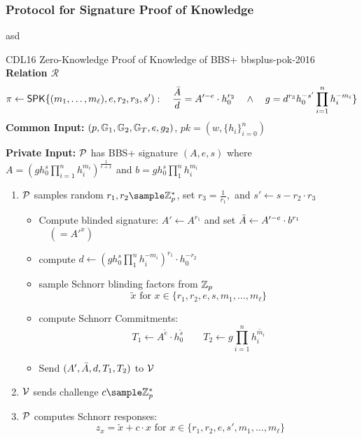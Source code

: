{\subsubsection{Protocol for Signature Proof of Knowledge}
asd
\begin{protocol}{CDL16 Zero-Knowledge Proof of Knowledge of BBS+  \cite{camenisch_anonymous_2016}}{bbsplus-pok-2016}
    \textbf{Relation $\mathcal{R}$}
        \[
        \pi \gets \mathsf{SPK}\{(m_1,\ldots,m_{\ell}), e, r_2, r_3, s'): \quad \frac{\Bar{A}}{d} = A'^{-e} \cdot h_0^{r_2} \quad \wedge \quad g = d^{r_3}h_0^{-s'}\prod_{i=1}^n h_i^{-m_i}\}
        \]
    \textbf{Common Input:} $(p, \mathbb{G}_1, \mathbb{G}_2, \mathbb{G}_T, e, g_2)$, $pk = (\hat{w}, \{h_i\}_{i=0}^n)$

    \textbf{Private Input:} $\mathcal{P}$ has BBS+ signature $(A,e,s)$ where $A = (gh_0^s\prod_{i=1}^n h_i^{m_i})^{\frac{1}{e+x}}$ and $b = gh_0^s \prod_1^nh_i^{m_i}$

    \vspace{1em}
    \begin{enumerate}
        \item $\mathcal{P}$ samples random $r_1, r_2 \sample \Z_p^*$, set $r_3 = \frac{1}{r_1},$ and $s' \gets s - r_2 \cdot r_3$
         \begin{itemize}
        \item Compute blinded signature: $A' \gets A^{r_1}$ and set $\Bar{A} \gets A'^{-e} \cdot b^{r_1}$ $\quad (=A'^{x})$ 
        
        \item compute $d \gets (gh_0^s \prod_1^nh_i^{-m_i})^{r_1} \cdot h_0^{-r_2}$

        \item sample Schnorr blinding factors from $\mathbb{Z}_p$
         \[
         \tilde{x} \text{ for } x \in \{r_1, r_2, e, s, m_1, \ldots, m_{\ell}\}
         \]

        \item compute Schnorr Commitments:
        \[
        T_1 \gets A^{\tilde{e}} \cdot h_0^{\tilde{s}} \qquad T_2 \gets g\prod_{i=1}^n h_i^{\tilde{m_i}}
        \]
        
        \item  Send $(A', \Bar{A}, d, T_1, T_2)$ to $\mathcal{V}$
                
        \end{itemize}

    \item $\mathcal{V}$ sends challenge $c \sample \Z_p^*$\

    \item $\mathcal{P}$ computes Schnorr responses:
         \[
         z_x = \tilde{x} + c \cdot x \text{ for } x \in \{r_1, r_2, e, s', m_1, \ldots, m_{\ell}\}
         \]
 

\end{enumerate}
\end{protocol}}
